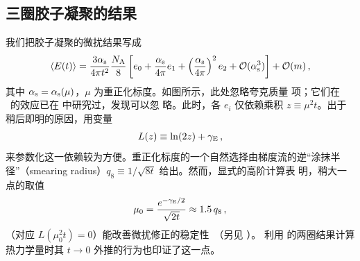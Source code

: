\subsection{三圈胶子凝聚的结果}

我们把胶子凝聚的微扰结果写成
\begin{equation}
  \langle E(t) \rangle = \frac{3\alpha_\mathrm{s}}{4\pi t^2} \frac{N_\mathrm{A}}{8}
  \left[e_0 + \frac{\alpha_\mathrm{s}}{4\pi} e_1 + \left(\frac{\alpha_\mathrm{s}}{4\pi}\right)^2 e_2 +
    \mathcal{O}(\alpha_\mathrm{s}^3)\right] + \mathcal{O}(m)\,,
  \label{eq:et}
\end{equation}
其中 $\alpha_\mathrm{s}=\alpha_\mathrm{s}(\mu)$，$\mu$ 为重正化标度。如图所示，此处忽略夸克质量
项；它们在 \nlo\ 的效应已在  中研究过，发现可以忽
略。此时，各 $e_i$ 仅依赖乘积 $z\equiv \mu^2t$。出于稍后即明的原因，用变量
\begin{equation}
  \begin{split}
    L(z) \equiv \ln(2z) + \gamma_\mathrm{E}\,,
  \end{split}
\end{equation}
来参数化这一依赖较为方便。重正化标度的一个自然选择由梯度流的逆``涂抹半
径''（smearing radius）$q_8\equiv 1/\sqrt{8t}$ 给出。然而，显式的高阶计算表
明，稍大一点的取值
\begin{equation}
  \begin{split}
    \mu_0 = \frac{e^{-\gamma_\mathrm{E}/2}}{\sqrt{2t}} \approx 1.5\,q_8\,,
    \label{eq:mu0}
  \end{split}
\end{equation}
（对应 $L(\mu_0^2t)=0$）能改善微扰修正的稳定性\,\cite{Harlander:2018zpi}
（另见 ）。 利用
 的两圈结果计算热力学量时其 $t\to 0$
外推的行为也印证了这一点。

